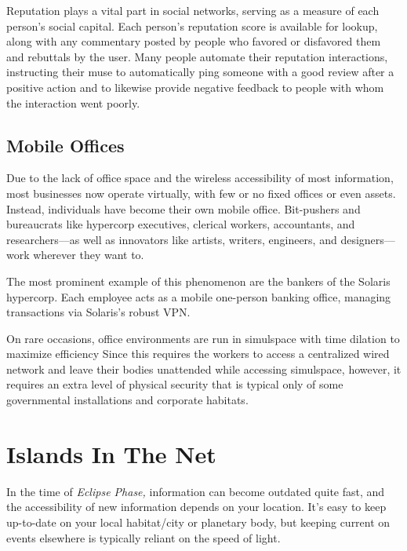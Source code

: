 Reputation plays a vital part in social networks, serving as a measure of each person's social capital. Each person's reputation score is available for lookup, along with any commentary posted by people who favored or disfavored them and rebuttals by the user. Many people automate their reputation interactions, instructing their muse to automatically ping someone with a good review after a positive action and to likewise provide negative feedback to people with whom the interaction went poorly. 

\subsection{Mobile Offices} 

Due to the lack of office space and the wireless accessibility of most information, most businesses now operate virtually, with few or no fixed offices or even assets. Instead, individuals have become their own mobile office. Bit-pushers and bureaucrats like hypercorp executives, clerical workers, accountants, and researchers—as well as innovators like artists, writers, engineers, and designers—work wherever they want to. 

The most prominent example of this phenomenon are the bankers of the Solaris hypercorp. Each employee acts as a mobile one-person banking office, managing transactions via Solaris's robust VPN. 

On rare occasions, office environments are run in simulspace with time dilation to maximize efficiency Since this requires the workers to access a centralized wired network and leave their bodies unattended while accessing simulspace, however, it requires an extra level of physical security that is typical only of some governmental installations and corporate habitats. 

\section{Islands In The Net} 

In the time of \textit{Eclipse Phase,} information can become outdated quite fast, and the accessibility of new information depends on your location. It's easy to keep up-to-date on your local habitat/city or planetary body, but keeping current on events elsewhere is typically reliant on the speed of light. 

